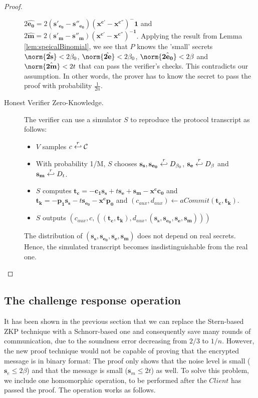 \begin{proof}
\begin{description}
    $2\hat{\mathbf{e_0}} = 2\mathbf{(s'_{e_0}-s''_{e_0})(x^{c'} -
      x^{c''})^-1}$ and $2\hat{\mathbf{m}}=2\mathbf{(s'_m -
      s''_m)(x^{c'} - x^{c''})^{-1}}$. Applying the result from Lemma
    \ref{lem:speicalBinomial}, we see that $P$ knows the 'small' secrets
    $\norm{\hat{\mathbf{2s}}} < 2\beta_0$, $\norm{\hat{\mathbf{2e}}} <
    2\beta_0$, $\norm{\hat{\mathbf{2e_0}}} < 2\beta$ and
    $\norm{\hat{\mathbf{2m}}} < 2t$ that can pass the verifier's checks.
    This contradicts our assumption. In other words, the prover has to
    know the secret to pass the proof with probability
    $\frac{1}{2n}$.
  \item [Honest Verifier Zero-Knowledge.] The verifier can use a
    simulator $S$ to reproduce the
    protocol transcript as follows:
    \begin{itemize}
    \item $V$ samples $c \stackrel{r}{\hookleftarrow} \mathcal{C}$
    \item With probability 1/M, $S$ chooses $\mathbf{s_s, s_{e_0}}
      \stackrel{r}{\hookleftarrow} D_{\beta_0}$, $\mathbf{s_e} \stackrel{r}{\hookleftarrow}
      D_{\beta}$ and $\mathbf{s_m} \stackrel{r}{\hookleftarrow} D_t$.
    \item $S$
      computes $\mathbf{t_c} = \mathbf{-c_1s_s} + t\mathbf{s_e} +
      \mathbf{s_m} - \mathbf{x^cc_0}$ and $\mathbf{t_k} =
      -\mathbf{p_1s_s} -t\mathbf{s_{e_0}} - \mathbf{x^cp_0}$ and
      $(c_{aux}, d_{aux}) \leftarrow aCommit(\mathbf{t_c,t_k})$.
    \item $S$ outputs $(c_{aux}, c, (\mathbf{(t_c,t_k)},
      d_{aux},(\mathbf{s_s,s_{e_0},s_e,s_m})))$
    \end{itemize}
    The distribution of $\mathbf{(s_s, s_{e_0}, s_e, s_m)}$ does not depend on
    real secrets. Hence, the simulated transcript becomes insdistinguishable
    from the real one.
  \end{description}
\end{proof}

\subsection{The challenge response operation}
\label{sec:challengeResponse}
It has been shown in the previous section that we can replace the Stern-based
ZKP technique with a Schnorr-based one and consequently save many rounds of communication,
due to the soundness error decreasing from $2/3$ to $1/n$. However, the new
proof technique would not be capable of proving that the encrypted message is in binary format:
The proof only shows that the noise level is small ($\mathbf{s}_{e} \leq 2\beta$) and that the
message is small ($\mathbf{s}_{m} \leq 2t$) as well. To solve this problem, we include
one homomorphic operation, to be performed  after the $Client$ has passed the proof. The operation works as follows.


